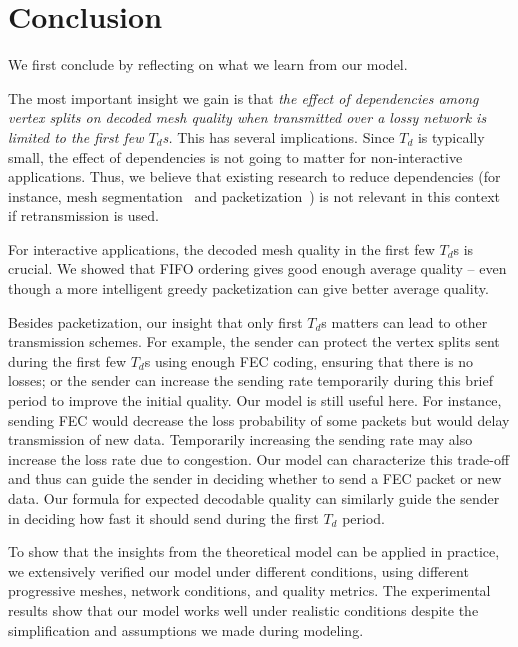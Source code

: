 \section{Conclusion}
\label{s:model:conclude}
We first conclude by reflecting on what we learn from our model.

The most important insight we gain is that \textit{the effect of
dependencies among vertex splits on decoded mesh quality when transmitted
over a lossy network is limited to the first few $T_d$s.}  This has
several implications.  Since $T_d$ is typically small, the effect of
dependencies is not going to matter for non-interactive applications.
Thus, we believe that existing research to reduce dependencies 
(for instance, mesh segmentation~\cite{error:Park,error:Yan} and
packetization~\cite{Gu:Packetization}) is not relevant in this
context if retransmission is used.

For interactive applications, the decoded mesh quality in the
first few $T_d$s is crucial.  We showed that FIFO ordering
gives good enough average quality -- even though a more intelligent
greedy packetization can give better average
quality. %

Besides packetization, our insight that only
first $T_d$s matters can lead to other transmission
schemes. For example, the sender can protect the vertex splits sent
during the first few $T_d$s using enough FEC coding, ensuring that
there is no losses; or the sender can increase the sending rate
temporarily during this brief period to improve the initial quality.
Our model is still useful here.  For instance, sending FEC would
decrease the loss probability of some packets but would delay
transmission of new data. 
Temporarily increasing the sending rate
may also increase the loss rate due to congestion. 
Our model can characterize this trade-off
and thus can guide the sender in deciding whether to send a FEC
packet or new data.  Our formula for expected decodable quality can
similarly guide the sender in deciding how fast it should send
during the first $T_d$ period.

To show that the insights from the theoretical model can be applied
in practice, we extensively verified our model under different conditions,
using different progressive meshes, network conditions, and quality metrics. 
The experimental results show that our model works well under realistic 
conditions despite the simplification and assumptions we made during
modeling.


